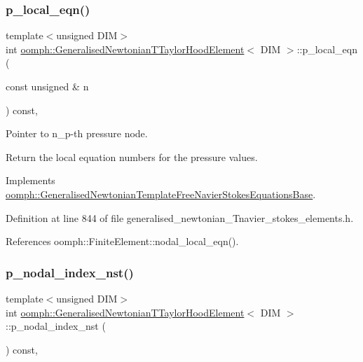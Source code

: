 \subsubsection{\texorpdfstring{p\+\_\+local\+\_\+eqn()}{p\_local\_eqn()}}
{\footnotesize\ttfamily template$<$unsigned D\+IM$>$ \\
int \hyperlink{classoomph_1_1GeneralisedNewtonianTTaylorHoodElement}{oomph\+::\+Generalised\+Newtonian\+T\+Taylor\+Hood\+Element}$<$ D\+IM $>$\+::p\+\_\+local\+\_\+eqn (\begin{DoxyParamCaption}\item[{const unsigned \&}]{n }\end{DoxyParamCaption}) const\hspace{0.3cm}{\ttfamily [inline]}, {\ttfamily [virtual]}}



Pointer to n\+\_\+p-\/th pressure node. 

Return the local equation numbers for the pressure values. 

Implements \hyperlink{classoomph_1_1GeneralisedNewtonianTemplateFreeNavierStokesEquationsBase_abacdc7add36a8da0b68b9f991e7973d9}{oomph\+::\+Generalised\+Newtonian\+Template\+Free\+Navier\+Stokes\+Equations\+Base}.



Definition at line 844 of file generalised\+\_\+newtonian\+\_\+\+Tnavier\+\_\+stokes\+\_\+elements.\+h.



References oomph\+::\+Finite\+Element\+::nodal\+\_\+local\+\_\+eqn().

\mbox{\label{classoomph_1_1GeneralisedNewtonianTTaylorHoodElement_af1aacc302260ae8d987bc48b560304f5}} 
\subsubsection{\texorpdfstring{p\+\_\+nodal\+\_\+index\+\_\+nst()}{p\_nodal\_index\_nst()}}
{\footnotesize\ttfamily template$<$unsigned D\+IM$>$ \\
int \hyperlink{classoomph_1_1GeneralisedNewtonianTTaylorHoodElement}{oomph\+::\+Generalised\+Newtonian\+T\+Taylor\+Hood\+Element}$<$ D\+IM $>$\+::p\+\_\+nodal\+\_\+index\+\_\+nst (\begin{DoxyParamCaption}{ }\end{DoxyParamCaption}) const\hspace{0.3cm}{\ttfamily [inline]}, {\ttfamily [virtual]}}



